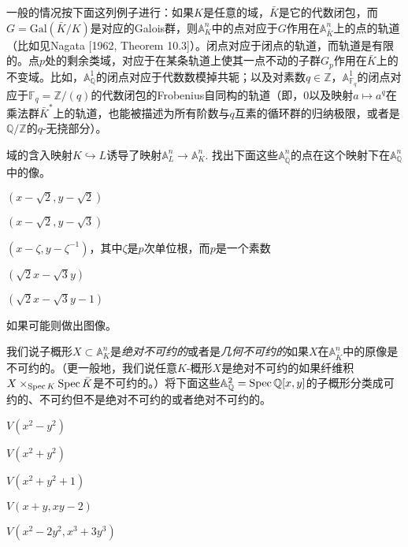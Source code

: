 一般的情况按下面这列例子进行：如果$K$是任意的域，$\bar K$是它的代数闭包，而$G=\mathrm{Gal}(\bar K/K)$是对应的Galois群，则$\mathbb{A}_{K}^n$中的点对应于$G$作用在$\mathbb{A}_{\bar K}^n$上的点的轨道（比如见Nagata [1962, Theorem 10.3]）。闭点对应于闭点的轨道，而轨道是有限的。点$p$处的剩余类域，对应于在某条轨道上使其一点不动的子群$G_p$作用在$\bar K$上的不变域。比如，$\mathbb{A}^1_\mathbb{Q}$的闭点对应于代数数模掉共轭；以及对素数$q\in \mathbb{Z}$，$\mathbb{A}_{\mathbb{F}_q}^1$的闭点对应于$\mathbb{F}_q=\mathbb{Z}/(q)$的代数闭包的Frobenius自同构的轨道（即，$0$以及映射$a\mapsto a^q$在乘法群$\bar K^*$上的轨道，也能被描述为所有阶数与$q$互素的循环群的归纳极限，或者是$\mathbb{Q}/\mathbb{Z}$的$q$-无挠部分）。

\begin{exe}
	域的含入映射$K\hookrightarrow L$诱导了映射$\mathbb{A}_L^n\to \mathbb{A}_K^n$. 找出下面这些$\mathbb{A}_{\overline{\mathbb{Q}}}^n$的点在这个映射下在$\mathbb{A}_{\mathbb{Q}}^n$中的像。
	\begin{compactenum}[(a)]
		\item $(x-\sqrt{2},y-\sqrt{2})$
		\item $(x-\sqrt{2},y-\sqrt{3})$
		\item $(x-\zeta,y-\zeta^{-1})$，其中$\zeta$是$p$次单位根，而$p$是一个素数
		\item $(\sqrt{2}x-\sqrt{3}y)$
		\item $(\sqrt{2}x-\sqrt{3}y-1)$
	\end{compactenum}
	如果可能则做出图像。
\end{exe}

\begin{exe}
	我们说子概形$X\subset \mathbb{A}_K^n$是\textit{绝对不可约的}或者是\textit{几何不可约的}如果$X$在$\mathbb{A}_{\bar K}^n$中的原像是不可约的。（更一般地，我们说任意$K$\hyp 概形$X$是绝对不可约的如果纤维积$X\times_{\operatorname{Spec} K}\operatorname{Spec} \bar{K}$是不可约的。）将下面这些$\mathbb{A}_\mathbb{Q}^2=\operatorname{Spec} \mathbb{Q}[x,y]$的子概形分类成可约的、不可约但不是绝对不可约的或者绝对不可约的。
	\begin{compactenum}[(a)]
		\item $V(x^2-y^2)$
		\item $V(x^2+y^2)$
		\item $V(x^2+y^2+1)$
		\item $V(x+y,xy-2)$
		\item $V(x^2-2y^2,x^3+3y^3)$
	\end{compactenum}
\end{exe}

